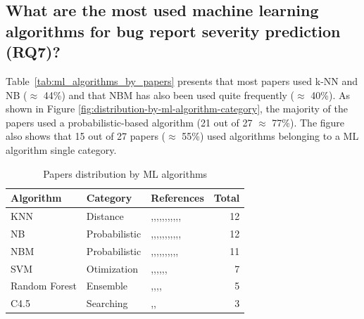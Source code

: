 \subsection{What are the most used machine learning algorithms for bug report severity prediction (RQ7)?}\label{subsec:rq7_result}

Table~\ref{tab:ml_algorithms_by_papers} presents that most papers used k-NN and NB ($\approx$ 44\%) and that NBM has also been used quite frequently ($\approx$ 40\%). As shown in Figure \ref{fig:distribution-by-ml-algorithm-category}, the majority of the papers used a probabilistic-based algorithm (21 out of 27 $\approx$ 77\%).  The figure also shows that 15 out of 27 papers ($\approx$ 55\%) used algorithms belonging to a ML algorithm single category.

\begin{table}[h!]
  \centering
  \captionsetup{type=table}\textsl{}
  \caption{Papers distribution by ML algorithms}
  \begin{tabular}{@{}llp{10cm}r@{}}
    \toprule
    \textbf{Algorithm} & \textbf{Category} & \textbf{References} & \textbf{Total} \\
    \midrule
    KNN & Distance & \cite{Lamkanfi:2011},\cite{Tian:2012},\cite{Yang:2014b},\cite{Valdivia:2014},\cite{Meera:2014},\cite{Zhang:2015},\cite{Gujral:2015},\cite{Sabor:2016},\cite{Tian:2016},\cite{Zhang:2016},\cite{Choeikiwong:2016},\cite{Singh:2017} & 12 \\
    \midrule
    NB & Probabilistic & \cite{Lamkanfi:2010},\cite{Lamkanfi:2011},\cite{Chaturvedi:2012},\cite{Yang:2014b},\cite{Valdivia:2014},\cite{Meera:2014},\cite{Roy:2014},\cite{Saha:2015},\cite{Zhang:2015},\cite{Otoom:2016},\cite{Choeikiwong:2016},\cite{Singh:2017} & 12 \\
    \midrule
    NBM\footnotemark & Probabilistic & \cite{Lamkanfi:2011},\cite{Yang:2012},\cite{Yang:2014a},\cite{Zhang:2015},\cite{Sharma:2015},\cite{Gujral:2015},\cite{Tian:2016},\cite{Jin:2016a},\cite{Jin:2016b},\cite{Jin:2016c},\cite{Yang:2017} & 11 \\
    \midrule
    SVM & Otimization & \cite{Lamkanfi:2011},\cite{Chaturvedi:2012},\cite{Meera:2014},\cite{Tian:2016},\cite{Choeikiwong:2016},\cite{Singh:2017},\cite{Roy:2017} & 7 \\
    \midrule
    Random Forest & Ensemble & \cite{Chaturvedi:2012},\cite{Valdivia:2014},\cite{Xia:2015},\cite{Otoom:2016},\cite{Choeikiwong:2016} & 5 \\
    \midrule
    C4.5\footnotemark & Searching & \cite{Chaturvedi:2012},\cite{Valdivia:2014},\cite{Pushpalathas:2016} & 3 \\

\end{tabular}
\end{table}
